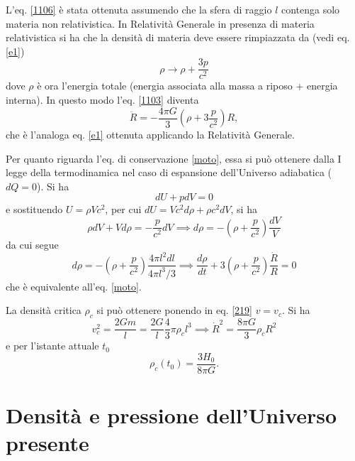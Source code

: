 L'eq. \eqref{1106} è stata ottenuta assumendo che la sfera di raggio $l$
contenga solo materia non relativistica.  In Relatività Generale in presenza di
materia relativistica si ha che la densità di materia deve essere rimpiazzata da
(vedi eq. \eqref{e1})
\begin{equation}
  \rho \to  \rho + \frac{3 p}{c^2}
\end{equation}
dove $\rho$ è ora l'energia totale (energia associata alla massa a riposo +
energia interna).  In questo modo l'eq. \eqref{1103} diventa
\begin{equation}
  \ddot R = - \frac{4 \pi G }{3} \left( \rho + 3 \frac{p}{c^2} \right) R,
\end{equation}
che è l'analoga eq. \eqref{e1} ottenuta applicando la Relatività Generale.

Per quanto riguarda l'eq. di conservazione \eqref{moto}, essa si può ottenere
dalla I legge della termodinamica nel caso di espansione dell'Universo
adiabatica ($dQ=0$).  Si ha
\begin{equation}
  dU + p dV=0
\end{equation}
e sostituendo $U=\rho V c^2$, per cui $dU= V c^2 d\rho + \rho c^2 dV$, si ha
\begin{equation}
  \rho dV + V d\rho = - \frac{p}{c^2} dV \implies
  d\rho= -\left( \rho + \frac{p}{c^2} \right) \frac{dV}{V}
\end{equation}
da cui segue
\begin{equation}
  d\rho= - \left( \rho + \frac{p}{c^2} \right) \frac{4 \pi l^2 dl}{4 \pi l^3/3}
  \implies \frac{d \rho}{dt} +  3 \left( \rho + \frac{p}{c^2} \right) \frac{\dot
    R }{R} =0
\end{equation}
che è equivalente all'eq. \eqref{moto}.

La densità critica $\rho_c$ si può ottenere ponendo in eq. \eqref{219}
$v=v_{c}$.  Si ha
\begin{equation}
  v^2_{c} = \frac{2 G m }{l}=\frac{2G}{l} \frac{4}{3} \pi \rho_c l^3 \implies
  \dot{R}^2= \frac{8 \pi G}{3} \rho_c R^2
\end{equation}
e per l'istante attuale $t_0$
\begin{equation}
\rho_c(t_{0}) = \frac{3 H_0}{8 \pi G}.
\end{equation}

\section{Densità e pressione dell'Universo presente}

